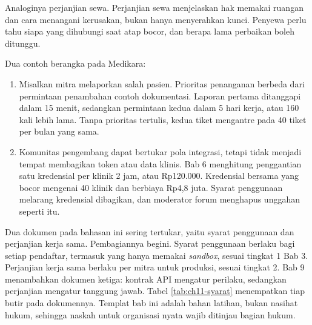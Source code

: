 Analoginya perjanjian sewa. Perjanjian sewa menjelaskan hak memakai ruangan dan cara menangani kerusakan, bukan hanya menyerahkan kunci. Penyewa
perlu tahu siapa yang dihubungi saat atap bocor, dan berapa lama perbaikan boleh ditunggu.

Dua contoh berangka pada Medikara:
\begin{enumerate}
  \item Misalkan mitra melaporkan salah pasien. Prioritas penanganan berbeda dari permintaan penambahan contoh dokumentasi. Laporan pertama
        ditanggapi dalam 15 menit, sedangkan permintaan kedua dalam 5 hari kerja, atau 160 kali lebih lama. Tanpa prioritas tertulis, kedua
        tiket mengantre pada 40 tiket per bulan yang sama.
  \item Komunitas pengembang dapat bertukar pola integrasi, tetapi tidak menjadi tempat membagikan token atau data klinis. Bab 6 menghitung
        penggantian satu kredensial per klinik 2 jam, atau Rp120.000. Kredensial bersama yang bocor mengenai 40 klinik dan berbiaya Rp4,8 juta. Syarat
        penggunaan melarang kredensial dibagikan, dan moderator forum menghapus unggahan seperti itu.
\end{enumerate}

Dua dokumen pada bahasan ini sering tertukar, yaitu syarat penggunaan dan perjanjian kerja sama. Pembagiannya begini. Syarat penggunaan berlaku
bagi setiap pendaftar, termasuk yang hanya memakai \textit{sandbox}, sesuai tingkat 1 Bab 3. Perjanjian kerja sama berlaku per mitra untuk produksi,
sesuai tingkat 2. Bab 9 menambahkan dokumen ketiga: kontrak API mengatur perilaku, sedangkan perjanjian mengatur tanggung jawab. Tabel
\ref{tab:ch11-syarat} menempatkan tiap butir pada dokumennya. Templat bab ini adalah bahan latihan, bukan nasihat hukum, sehingga naskah untuk
organisasi nyata wajib ditinjau bagian hukum.

